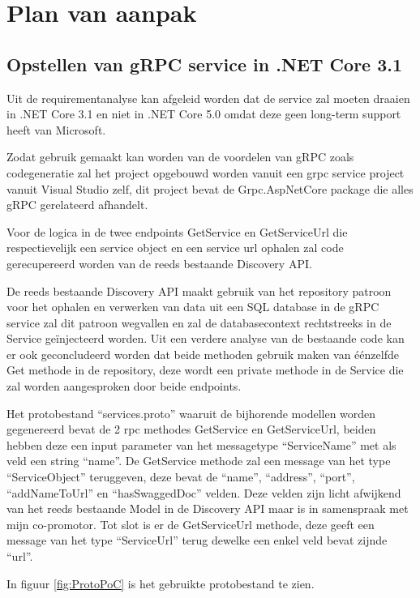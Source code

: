 \section{Plan van aanpak}
\label{sec:Plan van aanpak}

\subsection{Opstellen van gRPC service in .NET Core 3.1 }
\label{subsec:Opstellen van gRPC service in .NET Core 3.1}
Uit de requirementanalyse kan afgeleid worden dat de service zal moeten draaien in .NET Core 3.1 en niet in .NET Core 5.0 omdat deze geen long-term support heeft van Microsoft.

Zodat gebruik gemaakt kan worden van de voordelen van gRPC zoals codegeneratie zal het project opgebouwd worden vanuit een grpc service project vanuit Visual Studio zelf, dit project bevat de Grpc.AspNetCore package die alles gRPC gerelateerd afhandelt.

Voor de logica in de twee endpoints GetService en GetServiceUrl die respectievelijk een service object en een service url ophalen zal code gerecupereerd worden van de reeds bestaande Discovery API.

De reeds bestaande Discovery API maakt gebruik van het repository patroon voor het ophalen en verwerken van data uit een SQL database in de gRPC service zal dit patroon wegvallen en zal de databasecontext rechtstreeks in de Service geïnjecteerd worden. Uit een verdere analyse van de bestaande code kan er ook geconcludeerd worden dat beide methoden gebruik maken van éénzelfde Get methode in de repository, deze wordt een private methode in de Service die zal worden aangesproken door beide endpoints.

Het protobestand “services.proto” waaruit de bijhorende modellen worden gegenereerd bevat de 2 rpc methodes GetService en GetServiceUrl, beiden hebben deze een input parameter van het messagetype “ServiceName” met als veld een string “name”.
De GetService methode zal een message van het type “ServiceObject” teruggeven, deze bevat de “name”, “address”, “port”, “addNameToUrl” en “hasSwaggedDoc” velden. Deze velden zijn licht afwijkend van het reeds bestaande Model in de Discovery API maar is in samenspraak met mijn co-promotor.
Tot slot is er de GetServiceUrl methode, deze geeft een message van het type “ServiceUrl” terug dewelke een enkel veld bevat zijnde “url”.

In figuur \ref{fig:ProtoPoC} is het gebruikte protobestand te zien.

